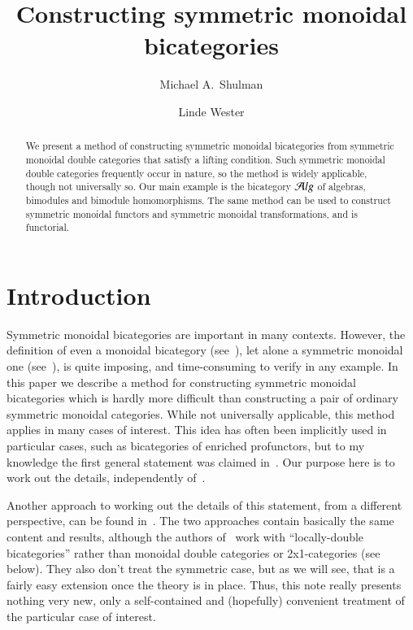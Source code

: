 \documentclass{amsart}
\title{Constructing symmetric monoidal bicategories}
\author{Michael A.\ Shulman}
\author{Linde Wester}
\begin{document}
\maketitle

\begin{abstract}
  We present a method of constructing symmetric monoidal bicategories
  from symmetric monoidal double categories that satisfy a lifting
  condition. Such symmetric monoidal double categories frequently
  occur in nature, so the method is widely applicable, though not
  universally so. Our main example is the bicategory ${\mathcal{A}}lg$ of algebras, bimodules and bimodule homomorphisms. The same method can be used to construct symmetric monoidal functors and symmetric monoidal transformations, and is functorial.   
\end{abstract}


\section{Introduction}
\label{sec:introduction}

Symmetric monoidal bicategories are important in many contexts.
However, the definition of even a monoidal bicategory
(see~\cite{gps:tricats,nick:tricats}), let alone a symmetric monoidal
one
(see~\cite{kv:2cat-zam,kv:bm2cat,bn:hda-i,ds:monbi-hopfagbd,crans:centers,mccrudden:bal-coalgb,gurski:brmonbicat}),
is quite imposing, and time-consuming to verify in any example.  In
this paper we describe a method for constructing symmetric monoidal
bicategories which is hardly more difficult than constructing a pair
of ordinary symmetric monoidal categories.  While not universally
applicable, this method applies in many cases of interest.  This idea
has often been implicitly used in particular cases, such as
bicategories of enriched profunctors, but to my knowledge the first
general statement was claimed in~\cite[Appendix B]{shulman:frbi}.  Our
purpose here is to work out the details, independently
of~\cite{shulman:frbi}.

\begin{rmk}
  Another approach to working out the details of this statement, from
  a different perspective, can be found
  in~\cite[\S5]{gg:ldstr-tricat}.  The two approaches contain
  basically the same content and results, although the authors
  of~\cite{gg:ldstr-tricat} work with ``locally-double bicategories''
  rather than monoidal double categories or 2x1-categories (see
  below).  They also don't treat the symmetric case, but as we will
  see, that is a fairly easy extension once the theory is in place.
  Thus, this note really presents nothing very new, only a
  self-contained and (hopefully) convenient treatment of the
  particular case of interest.
\end{rmk}
\end{document}
